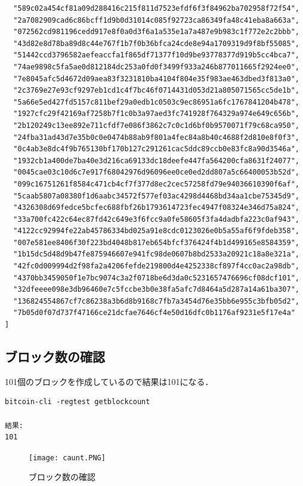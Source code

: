 \begin{verbatim}
  "589c02a454cf81a09d288416c215f811d7523efdf6f3f84962ba702958f72f54",
  "2a7082909cad6c86bcff1d9b0d31014c085f92723ca86349fa48c41eba8a663a",
  "072562cd981196cedd917e8f0a0d3f6a1a535e1a7a487e9b983c1f772e2c2bbb",
  "43d82e8d78ba89d8c44e767f1b7f0b36bfca24cde8e94a1709319d9f8bf55085",
  "51442ccd3796582aefeaccfa1f865df71377f10d9be93778377d919b5cc4bca7",
  "74ae9898c5fa5ae0d812184dc253a0fd0f3499f933a246b877011665f2924ee0",
  "7e8045afc5d4672d09aea83f3231810ba4104f804e35f983ae463dbed3f813a0",
  "2c3769e27e93cf9297eb1cd1c4f7bc46f0714431d053d21a805071565cc5de1b",
  "5a66e5ed427fd5157c811bef29a0edb1c0503c9ec86951a6fc1767841204b478",
  "1927cfc29f42169af7258b7f1c0b3a97aed3fc741928f764329a974e649c656b",
  "2b120249c13ee892e711cfdf7e086f3862c7c0c1d6bf0b9570071f79c68ca950",
  "24fba31ad43d7e35b0c0e0474b88ab9f801a4fec84a8b40c4688f2d810e8f0f3",
  "0c4ab3e8dc4f9b765130bf170b127c291261cac5ddc89ccb0e83fc8a90d3546a",
  "1932cb1a400de7ba40e3d216ca69133dc18deefe447fa564200cfa8631f24077",
  "0045cae03c10d6c7e917f68042976d96096ee0ce0ed2dd807a5c66400053b52d",
  "099c16751261f8584c471cb4cf7f377d8ec2cec57258fd79e94036610390f6af",
  "5caab5807a08380f1d6aabc34572f577ef03ac4298d4468bd34aa1cbe75345d9",
  "4326308d69fedce5bcfec688fbf26b1793614723fec4947f08324e346d75a824",
  "33a700fc422c64ec87fd42c649e3f6fcc9a0fe58605f3fa4dadbfa223c0af943",
  "4122cc92994fe22ab45786334bd025a91e8cdc0123026e0b5a55af6f9fdeb358",
  "007e581ee8406f30f223bd4048b817eb654bfcf376424f4b1d499165e8584359",
  "1b15dc5d48d9b47fe875946607e941fc98de0607b8bd2533a20921c18a8e321a",
  "42fc0d009994d2f98fa2a4206fefde219800d4e4252338cf897f4cc0ac2a98db",
  "4370bb3459050f1e7bc9074c3a2f0718be6d3da0c5231657476696cf08dcf101",
  "32dfeeee098e3db96460e7c5fccbe3b0e38fa5afc7d8464a5d287a14a61ba307",
  "136824554867cf7c86238a3b6d8b9168c7fb7a3454d76e35bb6e955c3bfb05d2",
  "7b05d0f07d737f47166ce21dcfae7646cf4e50d16dfc0b1176af9231e5f17e4a"
]
\end{verbatim}
\newpage

\subsection{ブロック数の確認}
101個のブロックを作成しているので結果は101になる．

\begin{verbatim}
bitcoin-cli -regtest getblockcount

結果:
101
\end{verbatim}


\begin{figure}[h]
\centering
\texttt{[image: caunt.PNG]}
\caption{ブロック数の確認}\label{サンプル図}
\end{figure}
\newpage


